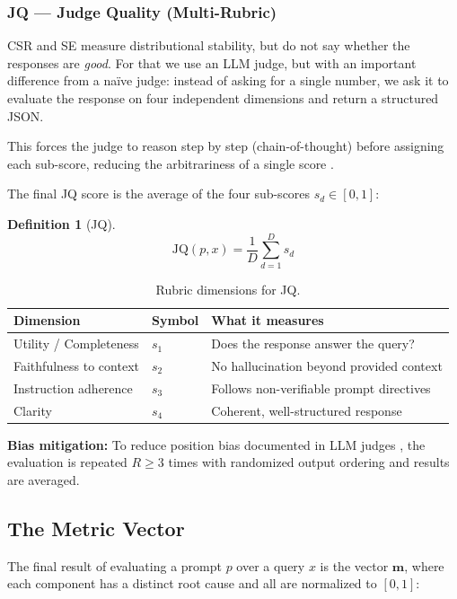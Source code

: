 \documentclass[11pt,a4paper]{article}
\newtheorem{definition}{Definition}
\begin{document}
\subsubsection{JQ — Judge Quality (Multi-Rubric)}

CSR and SE measure distributional stability, but do not say whether the responses are \textit{good}. For that we use an LLM judge, but with an important difference from a naïve judge: instead of asking for a single number, we ask it to evaluate the response on four independent dimensions and return a structured JSON.

This forces the judge to reason step by step (chain-of-thought) before assigning each sub-score, reducing the arbitrariness of a single score \citep{geval2023, unieval2022}.

The final JQ score is the average of the four sub-scores $s_d \in [0,1]$:

\begin{definition}[JQ]
\[
\mathrm{JQ}(p, x) = \frac{1}{D} \sum_{d=1}^{D} s_d
\]
\end{definition}

\begin{table}[h]
\centering
\caption{Rubric dimensions for JQ.}
\begin{tabular}{lll}
\toprule
Dimension & Symbol & What it measures \\
\midrule
Utility / Completeness & $s_1$ & Does the response answer the query? \\
Faithfulness to context & $s_2$ & No hallucination beyond provided context \\
Instruction adherence & $s_3$ & Follows non-verifiable prompt directives \\
Clarity & $s_4$ & Coherent, well-structured response \\
\bottomrule
\end{tabular}
\end{table}

\noindent \textbf{Bias mitigation:} To reduce position bias documented in LLM judges \citep{geval2023}, the evaluation is repeated $R \geq 3$ times with randomized output ordering and results are averaged.


\subsection{The Metric Vector}

The final result of evaluating a prompt $p$ over a query $x$ is the vector $\mathbf{m}$, where each component has a distinct root cause and all are normalized to $[0, 1]$:
\end{document}
